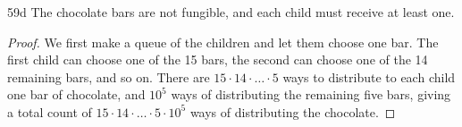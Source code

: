 \begin{exercise}{59d}
    The chocolate bars are not fungible, and each child must receive at least one.
\end{exercise}

\begin{proof}
    We first make a queue of the children and let them choose one bar. The first child can choose one of the 15 bars, the second can choose one of the 14 remaining bars, and so on. There are $15 \cdot 14 \cdot \dots \cdot 5$ ways to distribute to each child one bar of chocolate, and $10^5$ ways of distributing the remaining five bars, giving a total count of $15 \cdot 14 \cdot \dots \cdot 5 \cdot 10^5$ ways of distributing the chocolate.
\end{proof}

\newpage

